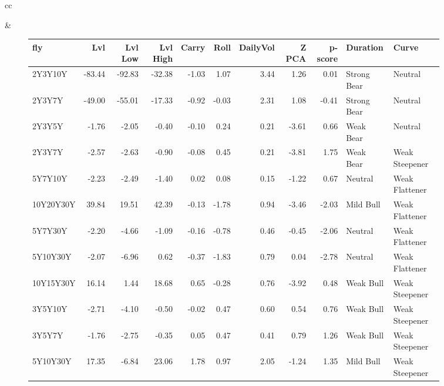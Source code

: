 \documentclass[a4paper,oneside]{report}
\begin{document}
\begin{figure}[htbp]
\begin{tabular}[c]{cc}
 
\begin{subfigure}[c]{0.5\textwidth}
 
 \end{subfigure}&
 
 \begin{subfigure}[c]{0.5\textwidth}
 \begin{adjustbox}{max width=\textwidth}
 \begin{tabular}{lrrrrrrrrll}
\hline
       fly &    Lvl &  Lvl Low &  Lvl High &  Carry &  Roll &  DailyVol &  Z PCA &  p-score &     Duration &           Curve \\
\hline
   2Y3Y10Y & -83.44 &   -92.83 &    -32.38 &  -1.03 &  1.07 &      3.44 &   1.26 &     0.01 &  Strong Bear &         Neutral \\
    2Y3Y7Y & -49.00 &   -55.01 &    -17.33 &  -0.92 & -0.03 &      2.31 &   1.08 &    -0.41 &  Strong Bear &         Neutral \\
    2Y3Y5Y &  -1.76 &    -2.05 &     -0.40 &  -0.10 &  0.24 &      0.21 &  -3.61 &     0.66 &    Weak Bear &         Neutral \\
    2Y3Y7Y &  -2.57 &    -2.63 &     -0.90 &  -0.08 &  0.45 &      0.21 &  -3.81 &     1.75 &    Weak Bear &  Weak Steepener \\
   5Y7Y10Y &  -2.23 &    -2.49 &     -1.40 &   0.02 &  0.08 &      0.15 &  -1.22 &     0.67 &      Neutral &  Weak Flattener \\
 10Y20Y30Y &  39.84 &    19.51 &     42.39 &  -0.13 & -1.78 &      0.94 &  -3.46 &    -2.03 &    Mild Bull &  Weak Flattener \\
   5Y7Y30Y &  -2.20 &    -4.66 &     -1.09 &  -0.16 & -0.78 &      0.46 &  -0.45 &    -2.06 &      Neutral &  Weak Flattener \\
  5Y10Y30Y &  -2.07 &    -6.96 &      0.62 &  -0.37 & -1.83 &      0.79 &   0.04 &    -2.78 &      Neutral &  Weak Flattener \\
 10Y15Y30Y &  16.14 &     1.44 &     18.68 &   0.65 & -0.28 &      0.76 &  -3.92 &     0.48 &    Weak Bull &  Weak Steepener \\
   3Y5Y10Y &  -2.71 &    -4.10 &     -0.50 &  -0.02 &  0.47 &      0.60 &   0.54 &     0.76 &    Weak Bull &  Weak Steepener \\
    3Y5Y7Y &  -1.76 &    -2.75 &     -0.35 &   0.05 &  0.47 &      0.41 &   0.79 &     1.26 &    Weak Bull &  Weak Steepener \\
  5Y10Y30Y &  17.35 &    -6.84 &     23.06 &   1.78 &  0.97 &      2.05 &  -1.24 &     1.35 &    Mild Bull &  Weak Steepener \\

\end{tabular}
\end{adjustbox}
\end{subfigure}
\end{tabular}
\end{figure}
\end{document}
